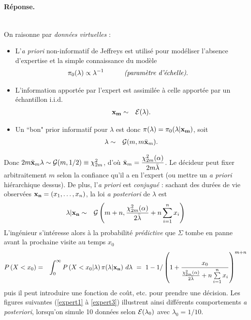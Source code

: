 \paragraph{\bf Réponse.} \\

On raisonne par \emph{données virtuelles} : 
\begin{itemize}
\item L'{\it a priori} non-informatif de Jeffreys est utilisé pour modéliser l'absence d'expertise et la simple connaissance du modèle 
\begin{eqnarray*}
\pi_{0}(\lambda) & \propto \lambda^{-1}  \ \ \ \ \ \ \ \ \text{ {\it (paramètre d'échelle)}}. 
\end{eqnarray*} 
\item L'information apportée par l'expert est assimilée à celle apportée par un échantillon i.i.d. 
\begin{eqnarray*}
{\bf x_m} & \sim & {\cal{E}}(\lambda).
\end{eqnarray*}
\item Un ``bon" prior informatif pour $\lambda$ est donc $\pi(\lambda)=\pi_0(\lambda|{\bf x_m})$, soit
\begin{eqnarray*}
\lambda & \sim & {\cal{G}}(m,m \bar{\bf x}_m).
\end{eqnarray*} 
\end{itemize}
Donc $2m \bar{\bf x}_m \lambda \sim {\cal{G}}(m,1/2) \equiv \chi^2_{2m}$, d'où ${\displaystyle \bar{\bf x}_m  =  \frac{\chi^2_{2m}(\alpha)}{2m\bar{\lambda}}}$. Le décideur peut fixer arbitraitement $m$ selon la confiance qu'il a en l'expert {(ou mettre un {\it a priori} hiérarchique dessus)}. De plus, l'{\it a priori} est \emph{conjugué} : sachant des durées de vie observées ${\bf x_n}=(x_1,\ldots,x_n)$, la loi {\it a posteriori} de $\lambda$ est
\begin{eqnarray*}
\lambda|{\bf x_n} & \sim & {\cal{G}}\left(m+n,\frac{\chi^2_{2m}(\alpha)}{2\bar{\lambda}} + n\sum\limits_{i=1}^n x_i\right)
\end{eqnarray*} 
L'ingénieur s'intéresse alors à la probabilité \emph{prédictive} que $\Sigma$ tombe en panne avant la prochaine visite au temps $x_0$
\begin{eqnarray*}
P\left(X<x_0\right)  & = & \int_{0}^{\infty} P\left(X<x_0|\lambda\right) \pi(\lambda|{\bf x_n}) \ d\lambda \ = \ 
                   1 - 1/\left(1 + \frac{x_0}{\frac{\chi^2_{2m}(\alpha)}{2\bar{\lambda}} + n\sum\limits_{i=1}^n x_i}\right)^{m+n}
\end{eqnarray*}
puis il peut introduire une fonction de co\^ut, etc. pour prendre une décision. Les figures suivantes (\ref{expert1} à \ref{expert3}) illustrent ainsi différents comportements {\it a posteriori}, lorsqu'on simule 10 données selon ${\cal{E}}(\lambda_0)$ avec $\lambda_0=1/10$. \\ 

